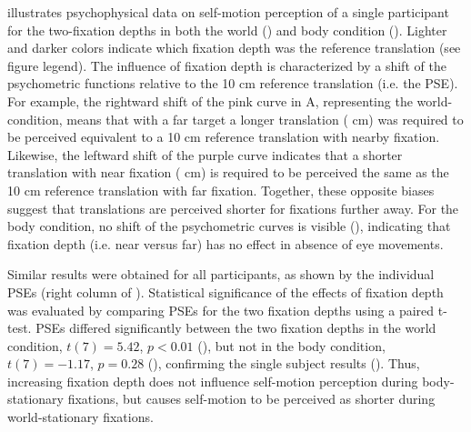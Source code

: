  illustrates psychophysical data on self-motion perception of a single participant for the two-fixation depths in both the world () and body condition (). Lighter and darker colors indicate which fixation depth was the reference translation (see figure legend). The influence of fixation depth is characterized by a shift of the psychometric functions relative to the 10 \si{\centi\metre} reference translation (i.e. the PSE). For example, the rightward shift of the pink curve in A, representing the world-condition, means that with a far target a longer translation ( \si{\centi\metre}) was required to be perceived equivalent to a 10 \si{\centi\metre} reference translation with nearby fixation. Likewise, the leftward shift of the purple curve indicates that a shorter translation with near fixation ( \si{\centi\metre}) is required to be perceived the same as the 10 \si{\centi\metre} reference translation with far fixation. Together, these opposite biases suggest that translations are perceived shorter for fixations further away. For the body condition, no shift of the psychometric curves is visible (), indicating that fixation depth (i.e. near versus far) has no effect in absence of eye movements.

Similar results were obtained for all participants, as shown by the individual PSEs (right column of ). Statistical significance of the effects of fixation depth was evaluated by comparing PSEs for the two fixation depths using a paired t-test. PSEs  differed significantly between the two fixation depths in the world condition, $t(7) = 5.42$, $p < 0.01$ (), but not in the body condition, $t(7) = -1.17$, $p = 0.28$ (), confirming the single subject results (). Thus, increasing fixation depth does not influence self-motion perception during body-stationary fixations, but causes self-motion to be perceived as shorter during world-stationary fixations.

